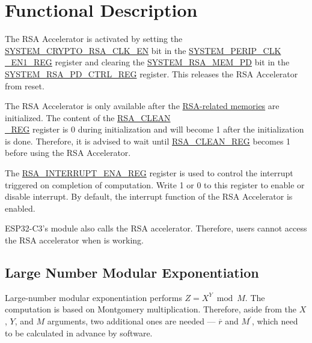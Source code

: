 \documentclass[main\_\_EN.tex]{subfiles}
\begin{document}
\section{Functional Description}

The RSA Accelerator is activated by setting the \hyperref[fielddesc:SYSTEMCRYPTORSACLKEN]{SYSTEM\_CRYPTO\_RSA\_CLK\_EN} bit in the \hyperref[regdesc:SYSTEMPERIPCLKEN1REG]{SYSTEM\_PERIP\_CLK\\\_EN1\_REG} register and clearing the \hyperref[fielddesc:SYSTEMRSAMEMPD]{SYSTEM\_RSA\_MEM\_PD} bit in the \hyperref[regdesc:SYSTEMRSAPDCTRLREG]{SYSTEM\_RSA\_PD\_CTRL\_REG} register. This releases the RSA Accelerator from reset.

The RSA Accelerator is only available after the \hyperref[sec:mem-sum]{RSA-related memories} are initialized. The content of the \hyperref[regdesc:RSACLEANREG]{RSA\_CLEAN\\\_REG} register is 0 during initialization and will become 1 after the initialization is done. Therefore, it is advised to wait until \hyperref[regdesc:RSACLEANREG]{RSA\_CLEAN\_REG} becomes 1 before using the RSA Accelerator.
 
The \hyperref[regdesc:RSAINTERRUPTENAREG]{RSA\_INTERRUPT\_ENA\_REG} register is used to control the interrupt triggered on completion of computation. Write 1 or 0 to this register to enable or disable interrupt. By default, the interrupt function of the RSA Accelerator is enabled.


\begin{importantlisting}
\vspace{-0.5em}

    ESP32-C3's  module also calls the RSA accelerator. Therefore, users cannot access the RSA accelerator when  is working.
\end{importantlisting}

\subsection{Large Number Modular Exponentiation} \label{sec:rsa-large-modular-Exponentiation}

Large-number modular exponentiation performs \begin{math}Z = X^{Y} \bmod M\end{math}. The computation is based on Montgomery multiplication. Therefore, aside from the \begin{math}X\end{math},
\begin{math}Y\end{math}, and
\begin{math}M\end{math} arguments, two additional ones are needed --- \begin{math}\overline{r}\end{math} and
\begin{math}M^{\prime}\end{math}, which need to be calculated in advance by software.
\end{document}
